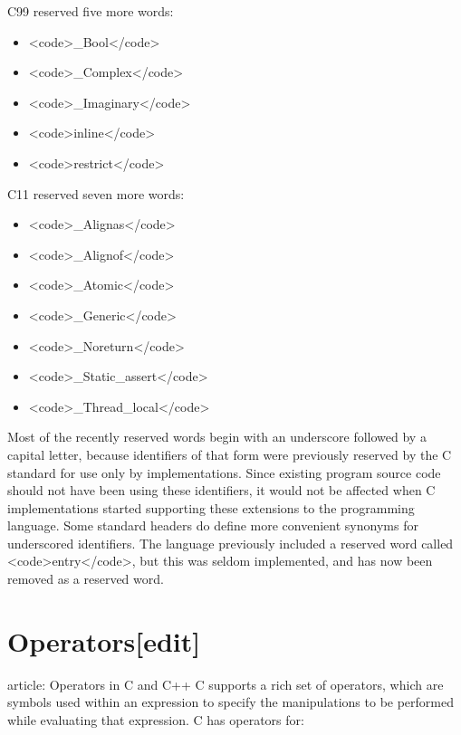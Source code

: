 \documentclass{article}\usepackage{titlesec}
\begin{document}
C99 reserved five more words:
\\

\item\begin{itemize}\item<code>\_Bool</code>
\item<code>\_Complex</code>
\item<code>\_Imaginary</code>
\item<code>inline</code>
\item<code>restrict</code>\end{itemize}

C11 reserved seven more words:
\\

\item\begin{itemize}\item<code>\_Alignas</code>
\item<code>\_Alignof</code>
\item<code>\_Atomic</code>
\item<code>\_Generic</code>
\item<code>\_Noreturn</code>
\item<code>\_Static\_assert</code>
\item<code>\_Thread\_local</code>\end{itemize}

Most of the recently reserved words begin with an underscore followed by a capital letter, because identifiers of that form were previously reserved by the C standard for use only by implementations.  Since existing program source code should not have been using these identifiers, it would not be affected when C implementations started supporting these extensions to the programming language.  Some standard headers do define more convenient synonyms for underscored identifiers. The language previously included a reserved word called <code>entry</code>, but this was seldom implemented, and has now been removed as a reserved word.
\\

\section{Operators[edit]}
\itemMain article: Operators in C and C++
C supports a rich set of operators, which are symbols used within an expression to specify the manipulations to be performed while evaluating that expression. C has operators for:
\\
\end{document}
